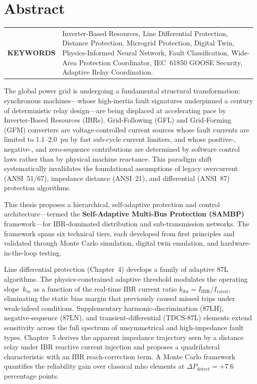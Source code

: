 \chapter{Abstract}

\begin{tabular}{@{} >{\bfseries}p{} p{} @{}}
\MakeUppercase{Keywords} &
Inverter-Based Resources, Line Differential Protection,
Distance Protection, Microgrid Protection, Digital Twin,
Physics-Informed Neural Network, Fault Classification,
Wide-Area Protection Coordinator, IEC~61850 GOOSE Security,
Adaptive Relay Coordination.
\end{tabular}
\par

\begin{doublespacing}

The global power grid is undergoing a fundamental structural transformation:
synchronous machines---whose high-inertia fault signatures underpinned a
century of deterministic relay design---are being displaced at accelerating
pace by Inverter-Based Resources (IBRs). Grid-Following (GFL) and
Grid-Forming (GFM) converters are voltage-controlled current sources whose
fault currents are limited to 1.1--2.0~pu by fast sub-cycle current
limiters, and whose positive-, negative-, and zero-sequence contributions
are determined by software control laws rather than by physical machine
reactance. This paradigm shift systematically invalidates the foundational
assumptions of legacy overcurrent (ANSI~51/67), impedance distance (ANSI~21),
and differential (ANSI~87) protection algorithms.

This thesis proposes a hierarchical, self-adaptive protection and control
architecture---termed the \textbf{Self-Adaptive Multi-Bus Protection (SAMBP)}
framework---for IBR-dominated distribution and sub-transmission networks.
The framework spans six technical tiers, each developed from first principles
and validated through Monte Carlo simulation, digital twin emulation, and
hardware-in-the-loop testing.

Line differential protection (Chapter~4) develops a family of adaptive 87L
algorithms. The physics-constrained adaptive threshold modulates the operating
slope~$k_m$ as a function of the real-time IBR current ratio
$k_\mathrm{ibr} = I_\mathrm{IBR}/I_\mathrm{rated}$, eliminating the static
bias margin that previously caused missed trips under weak-infeed conditions.
Supplementary harmonic-discrimination (87LH), negative-sequence (87LN), and
transient-differential (TDCS-87L) elements extend sensitivity across the full
spectrum of unsymmetrical and high-impedance fault types. Chapter~5 derives the
apparent impedance trajectory seen by a distance relay under IBR reactive current
injection and proposes a quadrilateral characteristic with an IBR reach-correction
term. A Monte Carlo framework quantifies the reliability gain over classical mho
elements at $\Delta P_\mathrm{detect} = +7.6$ percentage points.


\end{doublespacing}
